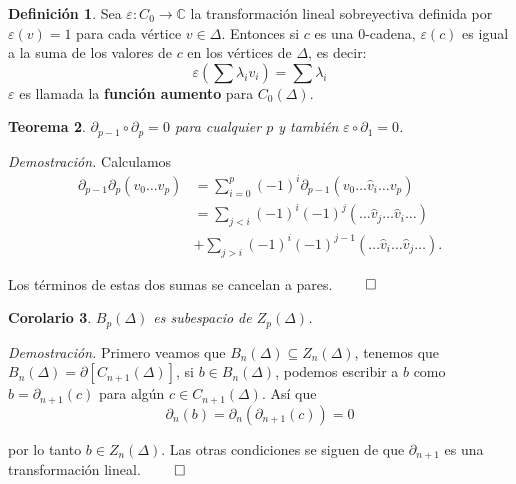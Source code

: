 \documentclass[12pt]{book}
\newtheorem{theorem}{Teorema}[section]
\newtheorem{corollary}[theorem]{Corolario}
\theoremstyle{definition}
\newtheorem{definition}[theorem]{Definición}
\newcounter{in}
\newcounter{ini}
\begin{document}
\begin{definition}
  Sea $\varepsilon:C_{0}\rightarrow \mathbb{C}$ la transformación
  lineal sobreyectiva definida por $\varepsilon(v)=1$ para cada
  vértice $v\in \Delta$. Entonces si $c$ es una $0$-cadena,
  $\varepsilon(c)$ es igual a la suma de los valores de $c$ en los
  vértices de $\Delta$, es decir:
  $$\varepsilon(\sum \lambda_{i}v_{i})=\sum\lambda_{i}$$
  $\varepsilon$ es llamada la \textbf{función aumento} para
  $C_{0}(\Delta)$.
\end{definition}

\begin{theorem}
  $\partial_{p-1}\circ\partial_{p}=0$ para cualquier $p$ y también $\varepsilon\circ\partial_{1}=0$.
\end{theorem}

\textit{Demostración.} Calculamos 
\begin{align*}
  \partial_{p-1}\partial_{p}(v_{0}\ldots
  v_{p})&=\sum_{i=0}^{p}(-1)^{i}\partial_{p-1}(v_{0}\ldots \widehat v_{i}\ldots v_{p})\\
  &=\sum_{j<i}(-1)^{i}(-1)^{j}(\ldots \widehat v_{j} \ldots \widehat v_{i} \ldots)\\
  &+\sum_{j>i}(-1)^{i}(-1)^{j-1}(\ldots\widehat v_{i}\ldots \widehat v_{j}\ldots).
\end{align*}

Los términos de estas dos sumas se cancelan a pares. $\qed$

\begin{corollary}
  $B_{p}(\Delta)$ es subespacio de $Z_{p}(\Delta)$.
\end{corollary}

\textit{Demostración.} Primero veamos que $B_{n}(\Delta)\subseteq Z_{n}(\Delta)$, tenemos que
$B_{n}(\Delta)=\partial[C_{n+1}(\Delta)]$, si $b\in B_{n}(\Delta)$,
podemos escribir a $b$ como $b=\partial_{n+1}(c)$ para algún $c\in
C_{n+1}(\Delta)$. Así que
$$\partial_{n}(b)=\partial_{n}(\partial_{n+1}(c))=0$$

por lo tanto $b\in Z_{n}(\Delta)$.
Las otras condiciones se siguen de que $\partial_{n+1}$ es una
transformación lineal. $\qed$
\end{document}
